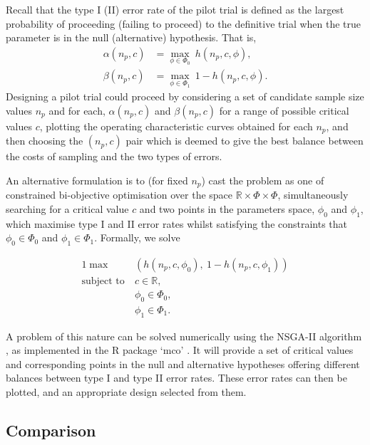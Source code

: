 \documentclass[AMA,STIX1COL]{WileyNJD-v2}
\begin{document}
Recall that the type I (II) error rate of the pilot trial is defined as the largest probability of proceeding (failing to proceed) to the definitive trial when the true parameter is in the null (alternative) hypothesis. That is, 
\begin{align*}
\alpha(n_p, c) &= \max_{\phi \in \Phi_0} ~ h(n_p, c, \phi) , \\
\beta(n_p, c) &= \max_{\phi \in \Phi_1}  ~ 1 - h(n_p, c, \phi).
\end{align*}
Designing a pilot trial could proceed by considering a set of candidate sample size values $n_p$ and for each, $\alpha(n_p, c)$ and $\beta(n_p, c)$ for a range of possible critical values $c$, plotting the operating characteristic curves obtained for each $n_p$, and then choosing the $(n_p, c)$ pair which is deemed to give the best balance between the costs of sampling and the two types of errors. 

An alternative formulation is to (for fixed $n_p$) cast the problem as one of constrained bi-objective optimisation over the space $\mathbb{R} \times \Phi \times \Phi$, simultaneously searching for a critical value $c$ and two points in the parameters space, $\phi_0$ and $\phi_1$, which maximise type I and II error rates whilst satisfying the constraints that $\phi_0 \in \Phi_0$ and $\phi_1 \in \Phi_1$. Formally, we solve

\begin{alignat}{1}\label{eqn:MO_opt}
\max ~ & \left( h(n_p, c, \phi_0) , ~ 1 - h(n_p, c, \phi_1)  \right) \\
\text{subject to} ~ & c \in \mathbb{R}, \nonumber \\ 
& \phi_0 \in \Phi_0, \nonumber  \\
& \phi_1 \in \Phi_1. \nonumber 
\end{alignat}

A problem of this nature can be solved numerically using the NSGA-II algorithm \cite{Deb2002}, as implemented in the R package `mco' \cite{Mersmann2014}. It will provide a set of critical values and corresponding points in the null and alternative hypotheses offering different balances between type I and type II error rates. These error rates can then be plotted, and an appropriate design selected from them.

\subsection{Comparison}
\end{document}
